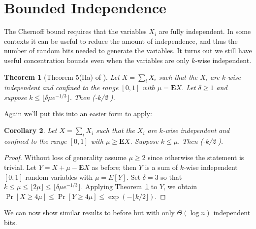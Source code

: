 \documentclass[11pt,a4paper]{article}
\newtheorem{theorem}{Theorem}
\newtheorem{corollary}[theorem]{Corollary}
\newcommand*{\E}[0]{\mathbf{E}}
\def\[#1\]{\begin{align*}#1\end{align*}}
\begin{document}
\section{Bounded Independence}

The Chernoff bound requires that the variables \(X_i\) are fully independent.
In some contexts it can be useful to reduce the amount of independence, and thus the number of random bits needed to generate the variables.
It turns out we still have useful concentration bounds even when the variables are only \(k\)-wise independent.

\begin{theorem}[Theorem 5(IIa) of \cite{limited-chernoff}]
  \label{thm:limited-chernoff}
  Let \(X = \sum_i X_i\) such that the \(X_i\) are \(k\)-wise independent and confined to the range \([0, 1]\) with \(\mu = \E X\).
  Let \(\delta \ge 1\) and suppose \(k \le \lfloor \delta \mu e^{-1/3} \rfloor.\)
  Then \[\Pr[X \ge (1 + \delta)\mu] \le \exp(-\lfloor k/2 \rfloor).\]
\end{theorem}

Again we'll put this into an easier form to apply:

\begin{tcolorbox}
  \begin{corollary}
    \label{cor:limited-chernoff-simple}
    Let \(X = \sum_i X_i\) such that the \(X_i\) are \(k\)-wise independent and confined to the range \([0, 1]\) with \(\mu \ge \E X\).
    Suppose \(k \le \mu.\)
    Then \[\Pr[X \ge 4\mu] \le \exp(-\lfloor k/2 \rfloor).\]
  \end{corollary}
\end{tcolorbox}
\begin{proof}
  Without loss of generality assume \(\mu \ge 2\) since otherwise the statement is trivial.
  Let \(Y = X + \mu - \E X\) as before; then \(Y\) is a sum of \(k\)-wise independent \([0, 1]\) random variables with \(\mu = E[Y]\).
  Set \(\delta = 3\) so that \(k \le \mu \le \lfloor 2\mu \rfloor \le \lfloor \delta \mu e^{-1/3} \rfloor\).
  Applying Theorem~\ref{thm:limited-chernoff} to \(Y\), we obtain
  \(\Pr[X \ge 4\mu] \le \Pr[Y \ge 4\mu] \le \exp(-\lfloor k/2 \rfloor).\)
\end{proof}

We can now show similar results to before but with only \(\Theta(\log n)\) independent bits.
\end{document}

